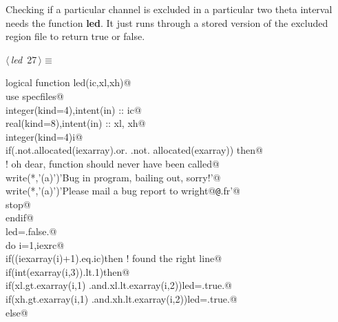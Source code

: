 \documentclass[10pt,a4paper,notitlepage]{article}
\newcommand{\code}[1]{\textbf{\textsf{#1}}} %
\begin{document}
\begin{flushleft}
\begin{minipage}{\linewidth}
\begin{list}{}{\setlength{\itemsep}{-\parsep}\setlength{\itemindent}{-\leftmargin}}
\item{}
\end{list}
\end{minipage}\vspace{4ex}
\end{flushleft}
Checking if a particular channel is excluded in a particular two theta interval
needs the function \code{led}. It just runs through a stored version of the 
excluded region file to return true or false.

\begin{flushleft} \small
\begin{minipage}{\linewidth}\label{scrap31}\raggedright\small
{} $\langle\,${\it led}\nobreak\ {\footnotesize {27}}$\,\rangle\equiv$
\vspace{-1ex}
\begin{list}{}{} \item
\mbox{}\verb@      logical function led(ic,xl,xh)@\\
\mbox{}\verb@      use specfiles@\\
\mbox{}\verb@      integer(kind=4),intent(in) :: ic@\\
\mbox{}\verb@      real(kind=8),intent(in) :: xl, xh@\\
\mbox{}\verb@      integer(kind=4)i@\\
\mbox{}\verb@      if(.not.allocated(iexarray).or. .not. allocated(exarray)) then@\\
\mbox{}\verb@! oh dear, function should never have been called@\\
\mbox{}\verb@        write(*,'(a)')'Bug in program, bailing out, sorry!'@\\
\mbox{}\verb@        write(*,'(a)')'Please mail a bug report to wright@{\tt @}\verb@esrf.fr'@\\
\mbox{}\verb@        stop@\\
\mbox{}\verb@      endif@\\
\mbox{}\verb@      led=.false.@\\
\mbox{}\verb@      do i=1,iexrc@\\
\mbox{}\verb@        if((iexarray(i)+1).eq.ic)then !  found the right line@\\
\mbox{}\verb@          if(int(exarray(i,3)).lt.1)then@\\
\mbox{}\verb@           if(xl.gt.exarray(i,1) .and.xl.lt.exarray(i,2))led=.true.@\\
\mbox{}\verb@           if(xh.gt.exarray(i,1) .and.xh.lt.exarray(i,2))led=.true.@\\
\mbox{}\verb@          else@\\

\end{list}
\end{minipage}
\end{flushleft}
\end{document}
